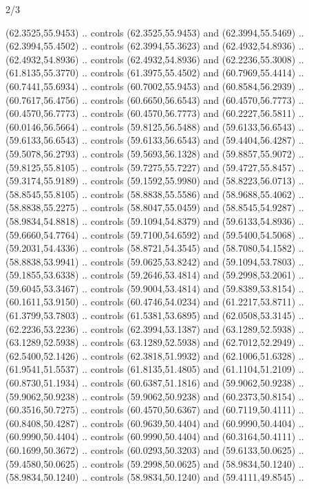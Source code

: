 \begin{flagdescription}{2/3}
\begin{scope}[xshift=0.3333\flaglength,yshift=0.5\flagwidth,scale=\flagwidth/711.3]
\begin{scope}
    (62.3525,55.9453) .. controls (62.3525,55.9453) and (62.3994,55.5469) ..
    (62.3994,55.4502) .. controls (62.3994,55.3623) and (62.4932,54.8936) ..
    (62.4932,54.8936) .. controls (62.4932,54.8936) and (62.2236,55.3008) ..
    (61.8135,55.3770) .. controls (61.3975,55.4502) and (60.7969,55.4414) ..
    (60.7441,55.6934) .. controls (60.7002,55.9453) and (60.8584,56.2939) ..
    (60.7617,56.4756) .. controls (60.6650,56.6543) and (60.4570,56.7773) ..
    (60.4570,56.7773) .. controls (60.4570,56.7773) and (60.2227,56.5811) ..
    (60.0146,56.5664) .. controls (59.8125,56.5488) and (59.6133,56.6543) ..
    (59.6133,56.6543) .. controls (59.6133,56.6543) and (59.4404,56.4287) ..
    (59.5078,56.2793) .. controls (59.5693,56.1328) and (59.8857,55.9072) ..
    (59.8125,55.8105) .. controls (59.7275,55.7227) and (59.4727,55.8457) ..
    (59.3174,55.9189) .. controls (59.1592,55.9980) and (58.8223,56.0713) ..
    (58.8545,55.8105) .. controls (58.8838,55.5586) and (58.9688,55.4062) ..
    (58.8838,55.2275) .. controls (58.8047,55.0459) and (58.8545,54.9287) ..
    (58.9834,54.8818) .. controls (59.1094,54.8379) and (59.6133,54.8936) ..
    (59.6660,54.7764) .. controls (59.7100,54.6592) and (59.5400,54.5068) ..
    (59.2031,54.4336) .. controls (58.8721,54.3545) and (58.7080,54.1582) ..
    (58.8838,53.9941) .. controls (59.0625,53.8242) and (59.1094,53.7803) ..
    (59.1855,53.6338) .. controls (59.2646,53.4814) and (59.2998,53.2061) ..
    (59.6045,53.3467) .. controls (59.9004,53.4814) and (59.8389,53.8154) ..
    (60.1611,53.9150) .. controls (60.4746,54.0234) and (61.2217,53.8711) ..
    (61.3799,53.7803) .. controls (61.5381,53.6895) and (62.0508,53.3145) ..
    (62.2236,53.2236) .. controls (62.3994,53.1387) and (63.1289,52.5938) ..
    (63.1289,52.5938) .. controls (63.1289,52.5938) and (62.7012,52.2949) ..
    (62.5400,52.1426) .. controls (62.3818,51.9932) and (62.1006,51.6328) ..
    (61.9541,51.5537) .. controls (61.8135,51.4805) and (61.1104,51.2109) ..
    (60.8730,51.1934) .. controls (60.6387,51.1816) and (59.9062,50.9238) ..
    (59.9062,50.9238) .. controls (59.9062,50.9238) and (60.2373,50.8154) ..
    (60.3516,50.7275) .. controls (60.4570,50.6367) and (60.7119,50.4111) ..
    (60.8408,50.4287) .. controls (60.9639,50.4404) and (60.9990,50.4404) ..
    (60.9990,50.4404) .. controls (60.9990,50.4404) and (60.3164,50.4111) ..
    (60.1699,50.3672) .. controls (60.0293,50.3203) and (59.6133,50.0625) ..
    (59.4580,50.0625) .. controls (59.2998,50.0625) and (58.9834,50.1240) ..
    (58.9834,50.1240) .. controls (58.9834,50.1240) and (59.4111,49.8545) ..

\end{scope}
\end{scope}
\end{flagdescription}
